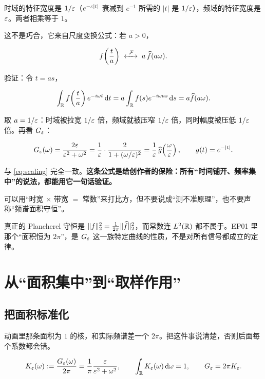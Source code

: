 时域的特征宽度是 $1/\varepsilon$（$e^{-\varepsilon|t|}$ 衰减到 $e^{-1}$ 所需的 $|t|$ 是 $1/\varepsilon$），频域的特征宽度是 $\varepsilon$。两者相乘等于 $1$。

这不是巧合，它来自尺度变换公式：若 $a>0$，

\begin{equation}
f\!\left(\frac{t}{a}\right)
\;\xleftrightarrow{\ \mathcal{F}\ }\;
a\,\widehat{f}(a\omega).\label{eq:scaling}
\end{equation}

验证：令 $t=as$，

\begin{equation}
\int_{\mathbb{R}}f\!\left(\frac{t}{a}\right)e^{-i\omega t}\mathop{}\!\mathrm{d} t
=a\int_{\mathbb{R}}f(s)e^{-i\omega a s}\mathop{}\!\mathrm{d} s
=a\widehat{f}(a\omega).
\end{equation}

取 $a=1/\varepsilon$：时域被拉宽 $1/\varepsilon$ 倍，频域就被压窄 $1/\varepsilon$ 倍，同时幅度被压低 $1/\varepsilon$ 倍。再看 $G_\varepsilon$：

\begin{equation}
G_\varepsilon(\omega)=\frac{2\varepsilon}{\varepsilon^{2}+\omega^{2}}
=\frac{1}{\varepsilon}\cdot\frac{2}{1+(\omega/\varepsilon)^{2}}
=\frac{1}{\varepsilon}\,\widehat{g}\!\left(\frac{\omega}{\varepsilon}\right),
\qquad g(t)=e^{-|t|}.
\end{equation}

与 \eqref{eq:scaling} 完全一致。\textbf{这条公式是给创作者的保险：所有“时间铺开、频率集中”的说法，都能用它一句话验证。}

\begin{warnbox}
可以用“时宽 $\times$ 带宽 $=$ 常数”来打比方，但不要说成“测不准原理”，也不要声称“频谱面积守恒”。

真正的 Plancherel 守恒是 $\|f\|_2^2=\frac{1}{2\pi}\|\widehat{f}\|_2^2$，而常数连 $L^2(\mathbb{R})$ 都不属于。EP01 里那个“面积恒为 $2\pi$”，是 $G_\varepsilon$ 这一族特定曲线的性质，不是对所有信号都成立的定律。
\end{warnbox}

\section{从“面积集中”到“取样作用”}

\subsection{把面积标准化}

动画里那条面积为 $1$ 的核，和实际频谱差一个 $2\pi$。把这件事说清楚，否则后面每个系数都会错。

\begin{equation}
K_\varepsilon(\omega):=\frac{G_\varepsilon(\omega)}{2\pi}
=\frac{1}{\pi}\frac{\varepsilon}{\varepsilon^{2}+\omega^{2}},
\qquad
\int_{\mathbb{R}}K_\varepsilon(\omega)\mathop{}\!\mathrm{d}\omega=1,
\qquad
G_\varepsilon=2\pi K_\varepsilon .\label{eq:Keps}
\end{equation}

